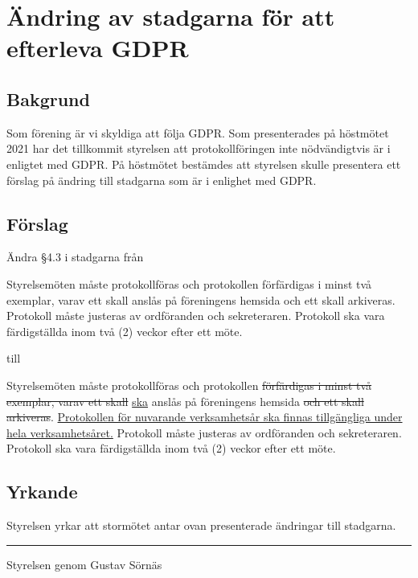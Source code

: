 \documentclass[12pt,a4paper]{article}
\newenvironment{quotationb}%
{\begin{leftbar}}%
{\end{leftbar}}
\newcommand{\thedate}{2022--04--23}
\begin{document}
\pagestyle{fancy}
\rhead{Proposition\\Linköping \thedate\\\phantom{}}

\hspace{20em}

\section{Ändring av stadgarna för att efterleva GDPR}

\subsection{Bakgrund}

Som förening är vi skyldiga att följa GDPR. Som presenterades på höstmötet 2021
har det tillkommit styrelsen att protokollföringen inte nödvändigtvis är i
enligtet med GDPR. På höstmötet bestämdes att styrelsen skulle presentera ett
förslag på ändring till stadgarna som är i enlighet med GDPR.

\subsection{Förslag}

Ändra \S4.3 i stadgarna från

\begin{quotationb}

Styrelsemöten måste protokollföras och protokollen förfärdigas i minst två
    exemplar, varav ett skall anslås på föreningens hemsida och ett skall
    arkiveras. Protokoll måste justeras av ordföranden och sekreteraren.
    Protokoll ska vara färdigställda inom två (2) veckor efter ett möte.

\end{quotationb}

till

\begin{quotationb}

Styrelsemöten måste protokollföras och protokollen \sout{förfärdigas i minst två
    exemplar, varav ett skall} \underline{ska} anslås på föreningens hemsida
    \sout{och ett skall arkiveras}. \underline{Protokollen för nuvarande
    verksamhetsår ska finnas tillgängliga under hela verksamhetsåret.} Protokoll
    måste justeras av ordföranden och sekreteraren. Protokoll ska vara
    färdigställda inom två (2) veckor efter ett möte.

\end{quotationb}


\subsection{Yrkande}

Styrelsen yrkar att stormötet antar ovan presenterade ändringar till stadgarna.

\rule{\linewidth}{1pt}

Styrelsen genom Gustav Sörnäs
\end{document}
